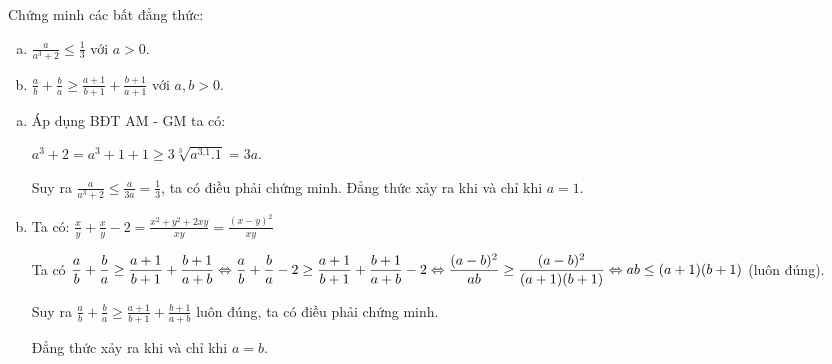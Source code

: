 \begin{problem}
	Chứng minh các bất đẳng thức:
	\begin{enumerate}[a)]
		\item 
		$\displaystyle \frac{a}{a^3 + 2} \le \frac{1}{3}$ với $a > 0$.
		\item 
		$\displaystyle \frac{a}{b} + \frac{b}{a} \ge \frac{a + 1}{b + 1} + \frac{b + 1}{a + 1}$
		với $a, b > 0$. 
	\end{enumerate}

	\solution
	\begin{enumerate}[a)]
		\item 
		Áp dụng BĐT AM - GM ta có:

		$a^3 + 2 = a^3 + 1 + 1 \ge 3\sqrt[3]{a^3.1.1} = 3a$.

		Suy ra $\displaystyle \frac{a}{a^3 + 2} \le \frac{a}{3a} = \frac{1}{3}$, ta có điều phải chứng minh. Đẳng thức xảy ra khi và chỉ khi $a = 1$.
		\item 
		Ta có: $\displaystyle \frac{x}{y} + \frac{x}{y} - 2 = \frac{x^2 + y^2 + 2xy}{xy} 
		= \frac{(x - y)^2}{xy}$

		Ta có $\displaystyle \frac{a}{b} + \frac{b}{a}
		\ge \frac{a + 1}{b + 1} + \frac{b + 1}{a + b}
		\Leftrightarrow \frac{a}{b} + \frac{b}{a} - 2
		\ge \frac{a + 1}{b + 1} + \frac{b + 1}{a + b} - 2 \\ 
		\Leftrightarrow \frac{(a - b)^2}{ab} \ge \frac{(a - b)^2}{(a + 1)(b + 1)} \\  
		\Leftrightarrow ab \le (a + 1)(b + 1)$ (luôn đúng).

		Suy ra $\displaystyle \frac{a}{b} + \frac{b}{a}
		\ge \frac{a + 1}{b + 1} + \frac{b + 1}{a + b}$ luôn đúng, ta có điều phải chứng minh.

		Đẳng thức xảy ra khi và chỉ khi $a = b$.
	\end{enumerate}
\end{problem}